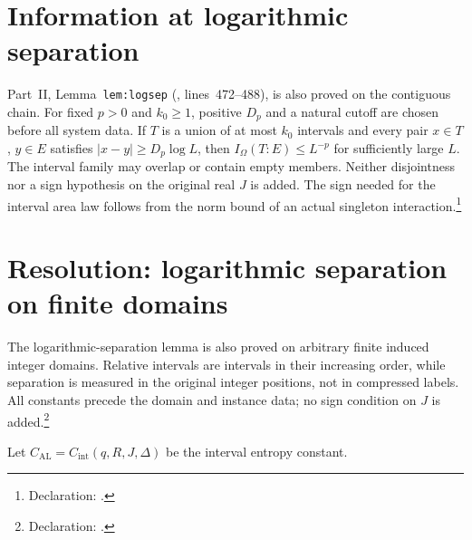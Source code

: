 \documentclass{article}
\begin{document}
\section{Information at logarithmic separation}

Part~II, Lemma~\texttt{lem:logsep}
(, lines~472--488), is also proved on
the contiguous chain. For fixed $p>0$ and $k_0\ge1$, positive $D_p$ and a
natural cutoff are chosen before all system data. If $T$ is a union of at
most $k_0$ intervals and every pair $x\in T$, $y\in E$ satisfies
$|x-y|\ge D_p\log L$, then $I_\Omega(T:E)\le L^{-p}$ for sufficiently
large $L$. The interval family may overlap or contain empty members.
Neither disjointness nor a sign hypothesis on the original real $J$ is
added. The sign needed for the interval area law follows from the norm
bound of an actual singleton interaction.\footnote{Declaration:
    .}

\section{Resolution: logarithmic separation on finite domains}

The logarithmic-separation lemma is also proved on arbitrary finite induced
 integer domains. Relative intervals are intervals in their increasing
 order, while separation is measured in the original integer positions,
 not in compressed labels. All constants precede the domain and instance
 data; no sign condition on $J$ is added.\footnote{Declaration:
 .}

Let $C_{\mathrm{AL}}=C_{\mathrm{int}}(q,R,J,\Delta)$ be the interval
entropy constant.
\end{document}
